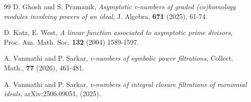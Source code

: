 \documentclass[11pt,reqno]{amsart}
\theoremstyle{definition}
\begin{document}
\begin{thebibliography}{99}
D. Ghosh and S. Pramanik, \emph{Asymptotic v-numbers of graded (co)homology modules involving powers of an ideal}, J. Algebra, \textbf{671}  (2025), 61-74.

  D. Katz, E. West, \emph{A linear function associated to asymptotic prime divisors}, Proc. Am. Math. Soc. \textbf{132} (2004) 1589-1597.

A. Vanmathi and P. Sarkar, \emph{v-numbers of symbolic power ﬁltrations}, Collect. Math., \textbf{77} (2026), 461-481.

A. Vanmathi and P. Sarkar, \emph{v-numbers of integral closure filtrations of monomial ideals}, arXiv:2506.09051, (2025).

\end{thebibliography}
\end{document}
